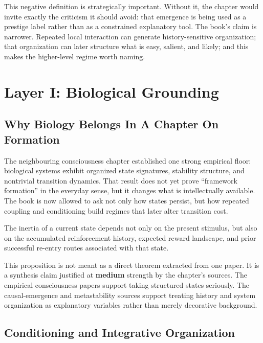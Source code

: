 \begin{discussion}
This negative definition is strategically important. Without it, the chapter
would invite exactly the criticism it should avoid: that emergence is being
used as a prestige label rather than as a constrained explanatory tool. The
book's claim is narrower. Repeated local interaction can generate
history-sensitive organization; that organization can later structure what is
easy, salient, and likely; and this makes the higher-level regime worth naming.
\end{discussion}

\section{Layer I: Biological Grounding}

\subsection{Why Biology Belongs In A Chapter On Formation}

The neighbouring consciousness chapter established one strong empirical floor:
biological systems exhibit organized state signatures, stability structure, and
nontrivial transition dynamics. That result does not yet prove ``framework
formation'' in the everyday sense, but it changes what is intellectually
available. The book is now allowed to ask not only how states persist, but how
repeated coupling and conditioning build regimes that later alter transition
cost.

\begin{proposition}
The inertia of a current state depends not only on the present stimulus, but
also on the accumulated reinforcement history, expected reward landscape, and
prior successful re-entry routes associated with that state.
\end{proposition}

\begin{discussion}
This proposition is not meant as a direct theorem extracted from one paper. It
is a synthesis claim justified at \textbf{medium} strength by the chapter's
sources. The empirical consciousness papers support taking structured states
seriously. The causal-emergence and metastability sources support treating
history and system organization as explanatory variables rather than merely
decorative background.
\end{discussion}

\subsection{Conditioning and Integrative Organization}

